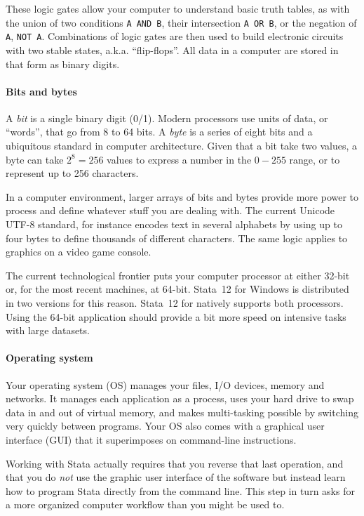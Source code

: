 These logic gates allow your computer to understand basic truth tables, as with the union of two conditions \texttt{A AND B}, their intersection \texttt{A OR B}, or the negation of \texttt{A}, \texttt{NOT A}. Combinations of logic gates are then used to build electronic circuits with two stable states, a.k.a. ``flip-flops''. All data in a computer are stored in that form as binary digits.%

%
\paragraph{Bits and bytes}%
%
A \emph{bit} is a single binary digit (0/1). Modern processors use units of data, or ``words'', that go from 8 to 64 bits. A \emph{byte} is a series of eight bits and a ubiquitous standard in computer architecture. Given that a bit take two values, a byte can take $2^8=256$ values to express a number in the $0-255$ range, or to represent up to 256 characters.%

In a computer environment, larger arrays of bits and bytes provide more power to process and define whatever stuff you are dealing with. The current Unicode UTF-8 standard, for instance encodes text in several alphabets by using up to four bytes to define thousands of different characters. The same logic applies to graphics on a video game console.%

The current technological frontier puts your computer processor at either 32-bit or, for the most recent machines, at 64-bit. Stata~12 for Windows is distributed in two versions for this reason. Stata~12 for \OSX natively supports both processors. Using the 64-bit application should provide a bit more speed on intensive tasks with large datasets.%

%
\paragraph{Operating system}%
%
Your operating system (OS) manages your files, I/O devices, memory and networks. It manages each application as a process, uses your hard drive to swap data in and out of virtual memory, and makes multi-tasking possible by switching very quickly between programs. Your OS also comes with a graphical user interface (GUI) that it superimposes on command-line instructions.%

Working with Stata actually requires that you reverse that last operation, and that you do \emph{not} use the graphic user interface of the software but instead learn how to program Stata directly from the command line. This step in turn asks for a more organized computer workflow than you might be used to.%

